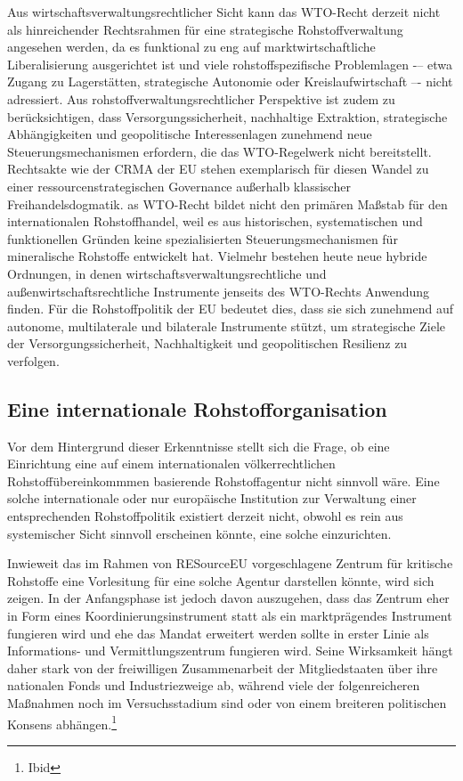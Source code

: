 \documentclass[12pt,a4paper,oneside]{book} %
\begin{document}
{Aus wirtschaftsverwaltungsrechtlicher Sicht kann das WTO-Recht derzeit nicht als hinreichender Rechtsrahmen für eine strategische Rohstoffverwaltung angesehen werden, da es funktional zu eng auf marktwirtschaftliche Liberalisierung ausgerichtet ist und viele rohstoffspezifische Problemlagen -– etwa Zugang zu Lagerstätten, strategische Autonomie oder Kreislaufwirtschaft –- nicht adressiert. Aus rohstoffverwaltungsrechtlicher Perspektive ist zudem zu berücksichtigen, dass Versorgungssicherheit, nachhaltige Extraktion, strategische Abhängigkeiten und geopolitische Interessenlagen zunehmend neue Steuerungsmechanismen erfordern, die das WTO-Regelwerk nicht bereitstellt. Rechtsakte wie der CRMA der EU stehen exemplarisch für diesen Wandel zu einer ressourcenstrategischen Governance außerhalb klassischer Freihandelsdogmatik. as WTO-Recht bildet nicht den primären Maßstab für den internationalen Rohstoffhandel, weil es aus historischen, systematischen und funktionellen Gründen keine spezialisierten Steuerungsmechanismen für mineralische Rohstoffe entwickelt hat. Vielmehr bestehen heute neue hybride Ordnungen, in denen wirtschaftsverwaltungsrechtliche und außenwirtschaftsrechtliche Instrumente jenseits des WTO-Rechts Anwendung finden. Für die Rohstoffpolitik der EU bedeutet dies, dass sie sich zunehmend auf autonome, multilaterale und bilaterale Instrumente stützt, um strategische Ziele der Versorgungssicherheit, Nachhaltigkeit und geopolitischen Resilienz zu verfolgen.

\subsection{Eine internationale Rohstofforganisation}
Vor dem Hintergrund dieser Erkenntnisse stellt sich die Frage, ob eine Einrichtung eine auf einem internationalen völkerrechtlichen Rohstoffübereinkommmen basierende Rohstoffagentur nicht sinnvoll wäre. Eine solche internationale oder nur europäische Institution zur Verwaltung einer entsprechenden Rohstoffpolitik existiert derzeit nicht, obwohl es rein aus systemischer Sicht sinnvoll erscheinen könnte, eine solche einzurichten. 

Inwieweit das im Rahmen von RESourceEU vorgeschlagene Zentrum für kritische Rohstoffe eine Vorlesitung für eine solche Agentur darstellen könnte, wird sich zeigen. In der Anfangsphase ist jedoch davon auszugehen, dass das Zentrum eher in Form eines Koordinierungsinstrument statt als ein marktprägendes Instrument fungieren wird und ehe das Mandat erweitert werden sollte in erster Linie als Informations- und Vermittlungszentrum fungieren wird.\autocite{https://www.delorscentre.eu/en/publications/detail/publication/the-eus-critical-raw-materials-predicament} Seine Wirksamkeit hängt daher stark von der freiwilligen Zusammenarbeit der Mitgliedstaaten über ihre nationalen Fonds und Industriezweige ab, während viele der folgenreicheren Maßnahmen noch im Versuchsstadium sind oder von einem breiteren politischen Konsens abhängen.\footnote{Ibid}

}
\end{document}
